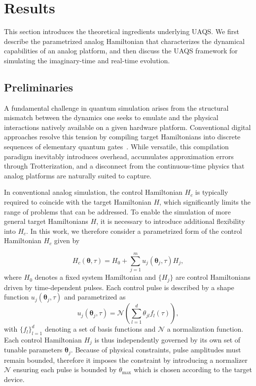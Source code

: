 \documentclass[twocolumn,
pra,aps,superscriptaddress,showpacs,amsmath,amssymb]{revtex4-2}
\begin{document}
\section{Results} 
This section introduces the theoretical ingredients underlying UAQS. We first describe the parametrized analog Hamiltonian that characterizes the dynamical capabilities of an analog platform, and then discuss the UAQS framework for simulating the imaginary-time and real-time evolution.

\subsection{Preliminaries}
A fundamental challenge in quantum simulation arises from the structural mismatch between the dynamics one seeks to emulate and the physical interactions natively available on a given hardware platform. Conventional digital approaches resolve this tension by compiling target Hamiltonians into discrete sequences of elementary quantum gates~\cite{li2017efficient,cirstoiu2020variational,yao2021adaptive,heya2023subspace}. 
While versatile, this compilation paradigm inevitably introduces overhead, accumulates approximation errors through Trotterization, and a disconnect from the continuous-time physics that analog platforms are naturally suited to capture. 

In conventional analog simulation, the control Hamiltonian $H_c$ is typically required to coincide with the target Hamiltonian $H$, which significantly limits the range of problems that can be addressed. To enable the simulation of more general target Hamiltonians $H$, it is necessary to introduce additional flexibility into $H_c$. In this work, we therefore consider a parametrized form of the control Hamiltonian $H_c$ given by

\begin{equation}\label{Eq:analogH}
H_c(\bm{\theta},\tau)=H_0+\sum_{j=1}^m u_j(\bm{\theta}_j,\tau)H_j,
\end{equation}
where $H_0$ denotes a fixed system Hamiltonian and $\{H_j\}$ are control Hamiltonians driven by time-dependent pulses. Each control pulse is described by a shape function $u_j(\bm{\theta}_j,\tau)$ and parametrized as
\begin{equation}
u_j(\bm{\theta}_j,\tau)=\mathcal{N}\left(\sum_{l=1}^d \theta_{jl} f_l(\tau)\right),
\end{equation}
with $\{f_l\}_{l=1}^d$ denoting a set of basis functions and $\mathcal{N}$ a normalization function. Each control Hamiltonian $H_j$ is thus independently governed by its own set of tunable parameters $\bm{\theta}_j$. Because of physical constraints, pulse amplitudes must remain bounded, therefore it imposes the constraint by introducing a normalizer $\mathcal{N}$ ensuring each pulse is bounded by $\theta_{\max}$ which is chosen according to the target device. 
\end{document}
